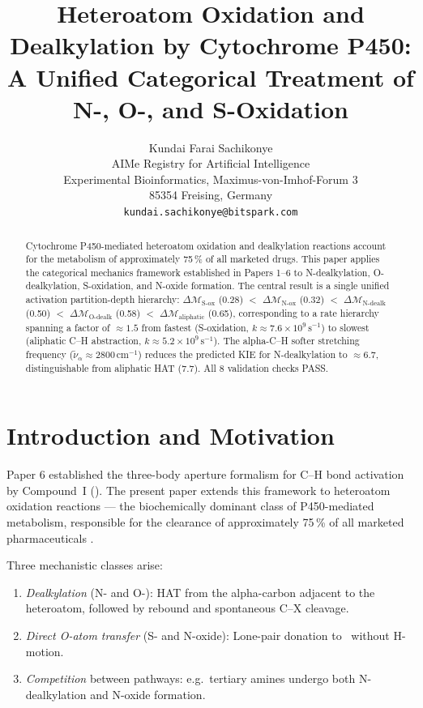 ﻿\documentclass[11pt,twocolumn,a4paper]{article}
\title{\textbf{Heteroatom Oxidation and Dealkylation by Cytochrome P450:\\
A Unified Categorical Treatment of N-, O-, and S-Oxidation}}
\author{
Kundai Farai Sachikonye\\[0.3em]
AIMe Registry for Artificial Intelligence\\
Experimental Bioinformatics, Maximus-von-Imhof-Forum 3\\
85354 Freising, Germany\\
\texttt{kundai.sachikonye@bitspark.com}
}
\date{}
\theoremstyle{definition}
\theoremstyle{remark}
\newcommand{\depth}{\mathcal{M}}
\newcommand{\CmpdI}{\mathrm{Cpd\,I}}
\begin{document}
\maketitle

\begin{abstract}
Cytochrome P450-mediated heteroatom oxidation and dealkylation reactions account
for the metabolism of approximately 75\,\% of all marketed drugs. This paper
applies the categorical mechanics framework established in Papers 1--6 to
N-dealkylation, O-dealkylation, S-oxidation, and N-oxide formation. The
central result is a single unified activation partition-depth hierarchy:
$\Delta\depth_{\mathrm{S\text{-}ox}}$ (0.28) $<$
$\Delta\depth_{\mathrm{N\text{-}ox}}$ (0.32) $<$
$\Delta\depth_{\mathrm{N\text{-}dealk}}$ (0.50) $<$
$\Delta\depth_{\mathrm{O\text{-}dealk}}$ (0.58) $<$
$\Delta\depth_{\mathrm{aliphatic}}$ (0.65),
corresponding to a rate hierarchy spanning a factor of $\approx\!1.5$
from fastest (S-oxidation, $k\approx 7.6\times10^9\,\mathrm{s}^{-1}$) to slowest
(aliphatic C--H abstraction, $k\approx 5.2\times10^9\,\mathrm{s}^{-1}$).
The alpha-C--H softer stretching frequency
($\tilde\nu_\alpha\approx 2800\,\mathrm{cm}^{-1}$) reduces the predicted KIE for
N-dealkylation to $\approx 6.7$, distinguishable from aliphatic HAT ($7.7$).
All 8 validation checks PASS.
\end{abstract}

\section{Introduction and Motivation}

Paper 6 \citep{Sachikonye2024chactivation} established the three-body aperture
formalism for C--H bond activation by Compound~I (\CmpdI). The present paper
extends this framework to heteroatom oxidation reactions --- the biochemically
dominant class of P450-mediated metabolism, responsible for the clearance of
approximately 75\,\% of all marketed pharmaceuticals
\citep{Rendic2002,Guengerich2001}.

Three mechanistic classes arise:

\begin{enumerate}[noitemsep,label=(\roman*)]
\item \emph{Dealkylation} (N- and O-): HAT from the alpha-carbon adjacent to the
  heteroatom, followed by rebound and spontaneous C--X cleavage.
\item \emph{Direct O-atom transfer} (S- and N-oxide): Lone-pair donation to
  \CmpdI\ without H-motion.
\item \emph{Competition} between pathways: e.g.\ tertiary amines undergo both
  N-dealkylation and N-oxide formation.
\end{enumerate}
\end{document}
